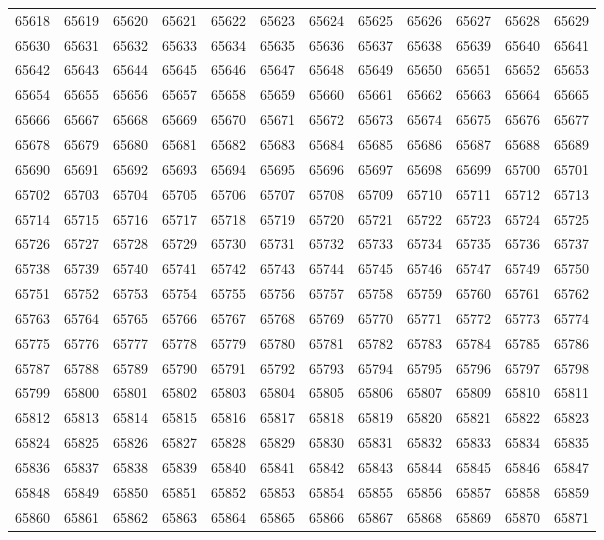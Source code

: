 \begin{center}
\begin{longtable}{llllllllllll}
65618 &65619 &65620 &65621 &65622 &65623 &65624 &65625 &65626 &65627 &65628 &65629 \\
65630 &65631 &65632 &65633 &65634 &65635 &65636 &65637 &65638 &65639 &65640 &65641 \\
65642 &65643 &65644 &65645 &65646 &65647 &65648 &65649 &65650 &65651 &65652 &65653 \\
65654 &65655 &65656 &65657 &65658 &65659 &65660 &65661 &65662 &65663 &65664 &65665 \\
65666 &65667 &65668 &65669 &65670 &65671 &65672 &65673 &65674 &65675 &65676 &65677 \\
65678 &65679 &65680 &65681 &65682 &65683 &65684 &65685 &65686 &65687 &65688 &65689 \\
65690 &65691 &65692 &65693 &65694 &65695 &65696 &65697 &65698 &65699 &65700 &65701 \\
65702 &65703 &65704 &65705 &65706 &65707 &65708 &65709 &65710 &65711 &65712 &65713 \\
65714 &65715 &65716 &65717 &65718 &65719 &65720 &65721 &65722 &65723 &65724 &65725 \\
65726 &65727 &65728 &65729 &65730 &65731 &65732 &65733 &65734 &65735 &65736 &65737 \\
65738 &65739 &65740 &65741 &65742 &65743 &65744 &65745 &65746 &65747 &65749 &65750 \\
65751 &65752 &65753 &65754 &65755 &65756 &65757 &65758 &65759 &65760 &65761 &65762 \\
65763 &65764 &65765 &65766 &65767 &65768 &65769 &65770 &65771 &65772 &65773 &65774 \\
65775 &65776 &65777 &65778 &65779 &65780 &65781 &65782 &65783 &65784 &65785 &65786 \\
65787 &65788 &65789 &65790 &65791 &65792 &65793 &65794 &65795 &65796 &65797 &65798 \\
65799 &65800 &65801 &65802 &65803 &65804 &65805 &65806 &65807 &65809 &65810 &65811 \\
65812 &65813 &65814 &65815 &65816 &65817 &65818 &65819 &65820 &65821 &65822 &65823 \\
65824 &65825 &65826 &65827 &65828 &65829 &65830 &65831 &65832 &65833 &65834 &65835 \\
65836 &65837 &65838 &65839 &65840 &65841 &65842 &65843 &65844 &65845 &65846 &65847 \\
65848 &65849 &65850 &65851 &65852 &65853 &65854 &65855 &65856 &65857 &65858 &65859 \\
65860 &65861 &65862 &65863 &65864 &65865 &65866 &65867 &65868 &65869 &65870 &65871 \\

\end{longtable}
\end{center}
